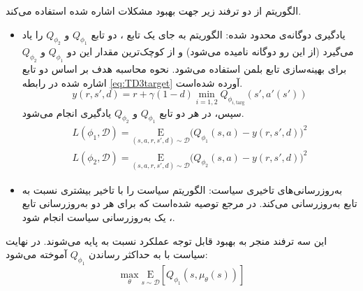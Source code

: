  
 الگوریتم
از دو ترفند زیر جهت بهبود مشکلات اشاره شده‌ استفاده می‌کند.
\begin{itemize}
	\item یادگیری دوگانه‌ی محدود شده:
	 الگوریتم 
	  به جای یک تابع ، دو تابع
	   \(Q_{\phi_1}\) و \(Q_{\phi_2}\)
	    را یاد می‌گیرد (از این رو دوگانه نامیده می‌شود) و از کوچک‌ترین مقدار این دو 
	     \(Q_{\phi_1}\) و \(Q_{\phi_2}\)
	      برای بهینه‌سازی تابع بلمن استفاده می‌شود. نحوه محاسبه هدف بر اساس دو تابع
	       اشاره شده
	       در رابطه
	       \eqref{eq:TD3target}
	       آورده شده‌است.
	      \begin{equation}\label{eq:TD3target}
	      	y(r,s',d) = r + \gamma (1 - d) \min_{i=1,2} Q_{\phi_{i, \text{targ}}}(s', a'(s'))
	      \end{equation}
	      سپس، در هر دو تابع \(Q_{\phi_1}\) و \(Q_{\phi_2}\) یادگیری انجام می‌شود.
	      \begin{align}
	       L(\phi_1, {\mathcal D}) = 
	       	\underset{(s,a,r,s',d) \sim {\mathcal D}}{{\mathrm E}}
	       	{
	       	\Bigg( Q_{\phi_1}(s,a) - y(r,s',d) \Bigg)^2
	       }\\
	       L(\phi_2, {\mathcal D}) = \underset{(s,a,r,s',d) \sim {\mathcal D}}{{\mathrm E}}
	       	 {
	       	\Bigg( Q_{\phi_2}(s,a) - y(r,s',d) \Bigg)^2
	       }
	      \end{align}
	  \item به‌روزرسانی‌های تاخیری سیاست:
	   الگوریتم
	  سیاست را با تاخیر بیشتری نسبت به تابع  به‌روزرسانی می‌کند. در مرجع
	  \cite{TD3}
	   توصیه شده‌است که برای هر دو به‌روزرسانی تابع ، یک به‌روزرسانی سیاست انجام شود.
\end{itemize}
این سه ترفند منجر به بهبود قابل توجه عملکرد
 نسبت به  پایه می‌شوند.
 در نهایت سیاست با به حداکثر رساندن \(Q_{\phi_1} \) آموخته می‌شود:
 \begin{equation}
	 \max_{\theta} \underset{s \sim {\mathcal D}}{{\mathrm E}}\left[ Q_{\phi_1}(s, \mu_{\theta}(s)) \right]
 \end{equation}
 
